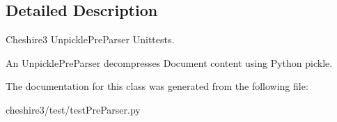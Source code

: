\subsection{Detailed Description}
\begin{DoxyVerb}Cheshire3 UnpicklePreParser Unittests.

An UnpicklePreParser decompresses Document content using Python pickle.
\end{DoxyVerb}
 

The documentation for this class was generated from the following file\-:\begin{DoxyCompactItemize}
\item 
cheshire3/test/test\-Pre\-Parser.\-py\end{DoxyCompactItemize}
